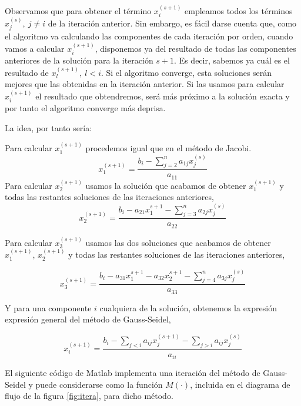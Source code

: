 Observamos que para obtener el término $x_i^{(s+1)}$ empleamos todos los términos $x_j^{(s)}, \ j\neq i$ de la iteración anterior. Sin embargo, es fácil darse cuenta que, como el algoritmo va calculando las componentes de cada iteración por orden, cuando vamos a calcular $x_i^{(s+1)}$, disponemos ya del resultado de todas las componentes anteriores de la solución para la iteración $s+1$. Es decir, sabemos ya cuál es el resultado de $x_l^{(s+1)}, \  l<i$. Si el algoritmo converge, esta soluciones serán mejores que las obtenidas en la iteración anterior. Si las usamos para calcular $x_i^{(s+1)}$ el resultado que obtendremos, será más próximo a la solución exacta y por tanto el algoritmo converge más deprisa.

La idea, por tanto sería: 

Para calcular $x_1^{(s+1)}$ procedemos igual que en el método de Jacobi. 
\begin{equation*}
x_1^{(s+1)}=\frac{b_i-\sum_{j=2}^n a_{1j}x_j^{(s)}}{a_{11}}
\end{equation*}
Para calcular $x_2^{(s+1)}$ usamos la solución que acabamos de obtener  $x_1^{(s+1)}$ y todas las restantes soluciones de las iteraciones anteriores,
\begin{equation*}
x_2^{(s+1)}=\frac{b_i-a_{21}x_1^{s+1}-\sum_{j=3}^na_{2j}x_j^{(s)}}{a_{22}}
\end{equation*}

Para calcular $x_3^{(s+1)}$ usamos las dos soluciones que acabamos de obtener  $x_1^{(s+1)}$, $x_2^{(s+1)}$ y todas las restantes soluciones de las iteraciones anteriores,

\begin{equation*}
x_3^{(s+1)}=\frac{b_i-a_{31}x_1^{s+1}-a_{32}x_2^{s+1}-\sum_{j=4}^na_{3j}x_j^{(s)}}{a_{33}}
\end{equation*}

Y para una componente $i$ cualquiera de la solución, obtenemos la expresión expresión general del método de Gauss-Seidel,
  
\begin{equation*}
x_i^{(s+1)}=\frac{b_i-\sum_{j< i}a_{ij}x_j^{(s+1)}-\sum_{j> i}a_{ij}x_j^{(s)}}{a_{ii}}
\end{equation*}

El siguiente código de Matlab implementa una iteración del método de Gauss-Seidel y puede considerarse como la función $M(\cdot)$, incluida en el diagrama de flujo de la figura \ref{fig:itera}, para dicho método.

